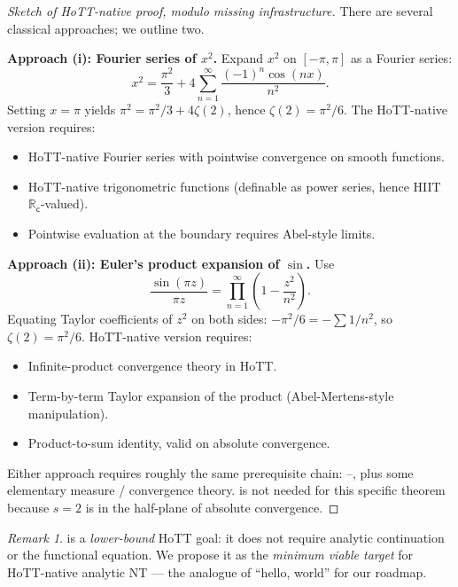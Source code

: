 \documentclass[12pt]{article}
\theoremstyle{definition}
\theoremstyle{remark}
\newtheorem{remark}[theorem]{Remark}
\newcommand{\R}{\mathbb{R}}
\newcommand{\Rc}{\R_{\mathsf{c}}}
\begin{document}
\begin{proof}[Sketch of HoTT-native proof, modulo missing infrastructure]
There are several classical approaches; we outline two.

\textbf{Approach (i): Fourier series of $x^2$.} Expand $x^2$ on $[-\pi,\pi]$
as a Fourier series:
\[
x^2 = \frac{\pi^2}{3} + 4\sum_{n=1}^{\infty} \frac{(-1)^n \cos(nx)}{n^2}.
\]
Setting $x = \pi$ yields $\pi^2 = \pi^2/3 + 4\zeta(2)$,
hence $\zeta(2) = \pi^2/6$. The HoTT-native version requires:
\begin{itemize}
\item HoTT-native Fourier series with pointwise convergence on smooth
functions.
\item HoTT-native trigonometric functions (definable as power series, hence
HIIT $\Rc$-valued).
\item Pointwise evaluation at the boundary requires Abel-style limits.
\end{itemize}

\textbf{Approach (ii): Euler's product expansion of $\sin$.} Use
\[
\frac{\sin(\pi z)}{\pi z} = \prod_{n=1}^{\infty}\left(1 - \frac{z^2}{n^2}\right).
\]
Equating Taylor coefficients of $z^2$ on both sides:
$-\pi^2/6 = -\sum 1/n^2$, so $\zeta(2) = \pi^2/6$. HoTT-native version
requires:
\begin{itemize}
\item Infinite-product convergence theory in HoTT.
\item Term-by-term Taylor expansion of the product (Abel-Mertens-style
manipulation).
\item Product-to-sum identity, valid on absolute convergence.
\end{itemize}

Either approach requires roughly the same prerequisite chain:
--, plus some elementary measure / convergence
theory.  is not needed for this specific theorem because $s=2$
is in the half-plane of absolute convergence.
\end{proof}

\begin{remark}\label{rem:zetatwo}
 is a \emph{lower-bound} HoTT goal: it does not require
analytic continuation or the functional equation. We propose it as the
\emph{minimum viable target} for HoTT-native analytic NT — the analogue of
``hello, world'' for our roadmap.
\end{remark}

\end{document}
